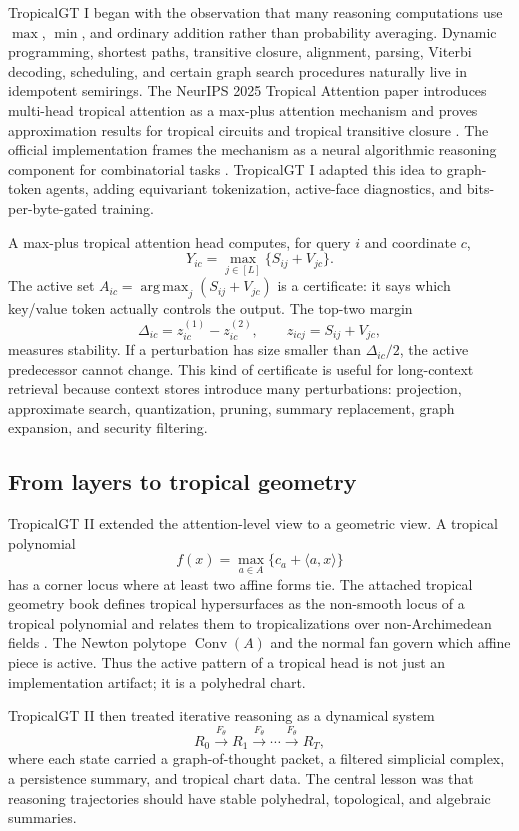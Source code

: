 \documentclass[11pt]{article}
\theoremstyle{definition}
\theoremstyle{remark}
\newcommand{\argmax}{\operatorname*{arg\,max}}
\begin{document}
TropicalGT I began with the observation that many reasoning computations use \(\max\), \(\min\), and ordinary addition rather than probability averaging. Dynamic programming, shortest paths, transitive closure, alignment, parsing, Viterbi decoding, scheduling, and certain graph search procedures naturally live in idempotent semirings. The NeurIPS 2025 Tropical Attention paper introduces multi-head tropical attention as a max-plus attention mechanism and proves approximation results for tropical circuits and tropical transitive closure \cite{Hashemi2025TA}. The official implementation frames the mechanism as a neural algorithmic reasoning component for combinatorial tasks \cite{TropicalAttentionCode}. TropicalGT I adapted this idea to graph-token agents, adding equivariant tokenization, active-face diagnostics, and bits-per-byte-gated training.

A max-plus tropical attention head computes, for query \(i\) and coordinate \(c\),
\[
    Y_{ic}=\max_{j\in [L]}\{S_{ij}+V_{jc}\}.
\]
The active set \(A_{ic}=\argmax_j(S_{ij}+V_{jc})\) is a certificate: it says which key/value token actually controls the output. The top-two margin
\[
    \Delta_{ic}=z^{(1)}_{ic}-z^{(2)}_{ic},\qquad z_{icj}=S_{ij}+V_{jc},
\]
measures stability. If a perturbation has size smaller than \(\Delta_{ic}/2\), the active predecessor cannot change. This kind of certificate is useful for long-context retrieval because context stores introduce many perturbations: projection, approximate search, quantization, pruning, summary replacement, graph expansion, and security filtering.

\subsection{From layers to tropical geometry}

TropicalGT II extended the attention-level view to a geometric view. A tropical polynomial
\[
    f(x)=\max_{a\in A}\{c_a+\langle a,x\rangle\}
\]
has a corner locus where at least two affine forms tie. The attached tropical geometry book defines tropical hypersurfaces as the non-smooth locus of a tropical polynomial and relates them to tropicalizations over non-Archimedean fields \cite{ItenbergMikhalkinShustin}. The Newton polytope \(\operatorname{Conv}(A)\) and the normal fan govern which affine piece is active. Thus the active pattern of a tropical head is not just an implementation artifact; it is a polyhedral chart.

TropicalGT II then treated iterative reasoning as a dynamical system
\[
    R_0\xrightarrow{F_\theta}R_1\xrightarrow{F_\theta}\cdots\xrightarrow{F_\theta}R_T,
\]
where each state carried a graph-of-thought packet, a filtered simplicial complex, a persistence summary, and tropical chart data. The central lesson was that reasoning trajectories should have stable polyhedral, topological, and algebraic summaries.
\end{document}
